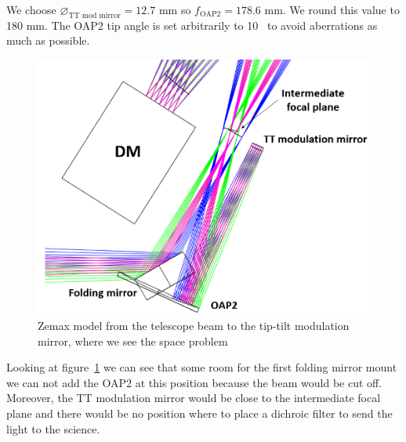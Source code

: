 \documentclass[12pt,a4paper]{article}
\begin{document}
We choose $\diameter_\text{TT mod mirror} = 12.7$ mm so $f_\text{OAP2} = 178.6$ mm. We round this value to 180 mm. The OAP2 tip angle is set arbitrarily to 10\degree~ to avoid aberrations as much as possible.

\begin{figure}[H]
	\begin{center}
		\includegraphics[width=.5\textwidth]{images/FP_OAP2_wrongV.PNG}
		\caption{Zemax model from the telescope beam to the tip-tilt modulation mirror, where we see the space problem}\label{fig:FP_OAP2_wrongV}
	\end{center}
\end{figure}
Looking at figure~\ref{fig:FP_OAP2_wrongV} we can see that some room for the first folding mirror mount we can not add the OAP2 at this position because the beam would be cut off. Moreover, the TT modulation mirror would be close to the intermediate focal plane and there would be no position where to place a dichroic filter to send the light to the science.
\end{document}
